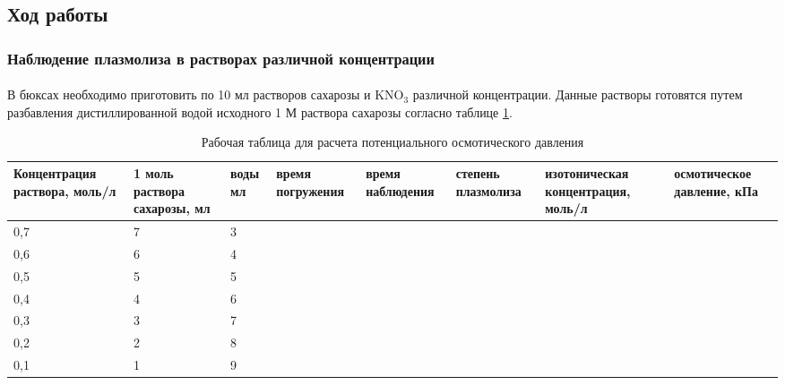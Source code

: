 \subsection*{Ход работы}

\subsubsection*{Наблюдение плазмолиза в растворах различной концентрации}

\paragraph*{}В бюксах необходимо приготовить по 10 мл растворов сахарозы и KNO$_3$ различной концентрации. Данные растворы готовятся путем разбавления дистиллированной водой исходного 1 М раствора сахарозы согласно таблице \ref{pot_osm_press_work}.

\begin{table}[!h]

\label{pot_osm_press_work}
\caption{Рабочая таблица для расчета потенциального осмотического давления}
\begin{tabular}{|p{2cm}|p{2cm}|p{1.5cm}|p{1.5cm}|p{1.5cm}|p{1.5cm}|p{1.5cm}|p{1.5cm}|}


\hline Концентра\-ция раствора, \- моль/л & 1 моль раствора сахарозы, мл & воды мл & время погружения & время наблюдения & степень плазмолиза & изотони\-ческая концентра\-ция,\- моль/л & осмоти\-ческое давление, кПа \\
\hline 0,7 & 7 & 3 &  &  &  & &  \\
\hline 0,6 & 6 & 4 &  &  &  & &  \\
\hline 0,5 & 5 & 5 &  &  &  & &  \\
\hline 0,4 & 4 & 6 &  &  &  & &  \\
\hline 0,3 & 3 & 7 &  &  &  & &  \\
\hline 0,2 & 2 & 8 &  &  &  & &  \\
\hline 0,1 & 1 & 9 &  &  &  & &  \\
\hline

\end{tabular}

\end{table}

